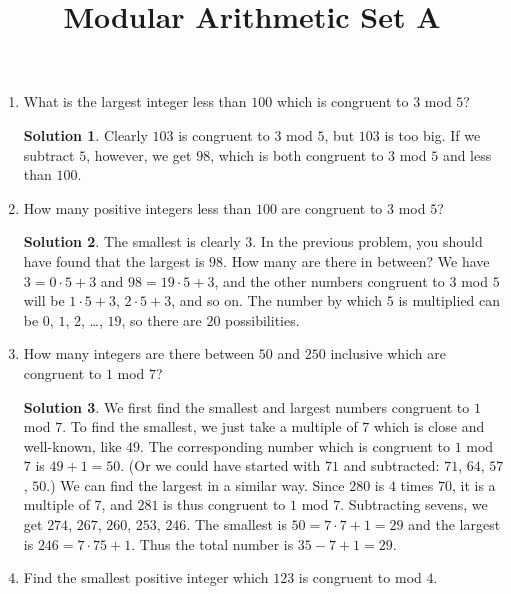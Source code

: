 \documentclass{article}
\title{Modular Arithmetic Set A}
\author{}
\date{}
\theoremstyle{definition}
\newtheorem*{solution}{Solution}
\begin{document}
\maketitle
\begin{multicols}{2}
    \begin{enumerate}
        \item What is the largest integer less than $100$ which is congruent to $3$ mod $5$?
            \begin{solution}
                Clearly $103$ is congruent to $3$ mod $5$, but $103$ is too big.
                If we subtract $5$, however, we get $98$, which is both congruent to $3$ mod $5$ and less than $100$.
            \end{solution}
        \item How many positive integers less than $100$ are congruent to $3$ mod $5$?
            \begin{solution}
                The smallest is clearly $3$.
                In the previous problem, you should have found that the largest is $98$.
                How many are there in between? 
                We have $3 = 0 \cdot 5 + 3$ and $98 = 19 \cdot 5 + 3$, and the other numbers congruent to $3$ mod $5$ will be $1 \cdot 5 + 3$, $2 \cdot 5 + 3$, and so on.
                The number by which $5$ is multiplied can be $0$, $1$, $2$, \ldots, $19$, so there are $20$ possibilities.
            \end{solution}
        \item How many integers are there between $50$ and $250$ inclusive which are congruent to $1$ mod $7$?
            \begin{solution}
                We first find the smallest and largest numbers congruent to $1$ mod $7$.
                To find the smallest, we just take a multiple of $7$ which is close and well-known, like $49$.
                The corresponding number which is congruent to $1$ mod $7$ is $49 + 1 = 50$.
                (Or we could have started with $71$ and subtracted: $71$, $64$, $57$, $50$.) 
                We can find the largest in a similar way.
                Since $280$ is $4$ times $70$, it is a multiple of $7$, and $281$ is thus congruent to $1$ mod $7$.
                Subtracting sevens, we get $274$, $267$, $260$, $253$, $246$.
                The smallest is $50 = 7 \cdot 7 + 1 = 29$ and the largest is $246 = 7 \cdot 75 + 1$.
                Thus the total number is $35 - 7 + 1 = 29$.
            \end{solution}
        \item Find the smallest positive integer which $123$ is congruent to mod $4$.

\end{enumerate}
\end{multicols}
\end{document}
